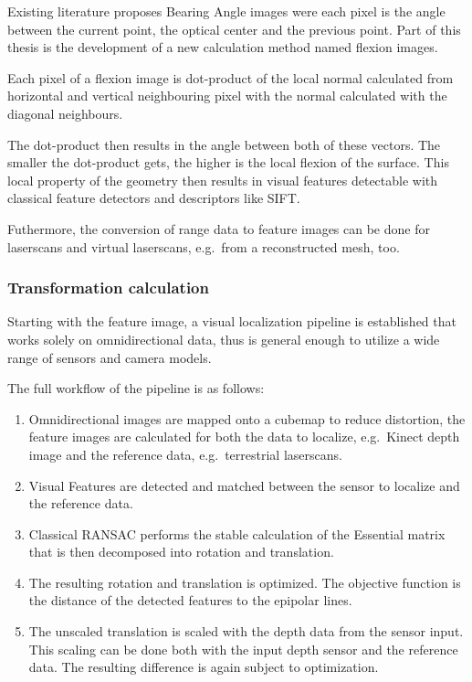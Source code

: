\documentclass[doktyp=marbeit,fontsize=12pt,sprache=english,draft=true,hausschrift=true]{TUBAFarbeiten}
\begin{document}
Existing literature proposes Bearing Angle images were each pixel is the
angle between the current point, the optical center and the previous
point. Part of this thesis is the development of a new calculation
method named flexion images.

Each pixel of a flexion image is dot-product of the local normal
calculated from horizontal and vertical neighbouring pixel with the
normal calculated with the diagonal neighbours.

The dot-product then results in the angle between both of these vectors.
The smaller the dot-product gets, the higher is the local flexion of the
surface. This local property of the geometry then results in visual
features detectable with classical feature detectors and descriptors like
SIFT.

Futhermore, the conversion of range data to feature images can be done
for laserscans and virtual laserscans, e.g.~from a reconstructed mesh,
too.

\subsubsection{Transformation calculation}\label{transformation-calculation}

Starting with the feature image, a visual localization pipeline is
established that works solely on omnidirectional data, thus is general
enough to utilize a wide range of sensors and camera models.

The full workflow of the pipeline is as follows:

\begin{enumerate}
\item Omnidirectional images are mapped onto a cubemap to reduce distortion,
  the feature images are calculated for both the data to localize,
  e.g.~Kinect depth image and the reference data, e.g.~terrestrial
  laserscans.
\item Visual Features are detected and matched between the sensor to
  localize and the reference data.
\item Classical RANSAC performs the stable calculation of the
  Essential matrix that is then decomposed into rotation and translation.
\item The resulting rotation and translation is optimized. The objective
  function is the distance of the detected features to the epipolar
  lines.
\item The unscaled translation is scaled with the depth data from the sensor
  input. This scaling can be done both with the input depth sensor and
  the reference data. The resulting difference is again subject to
  optimization.
\end{enumerate}
\end{document}
